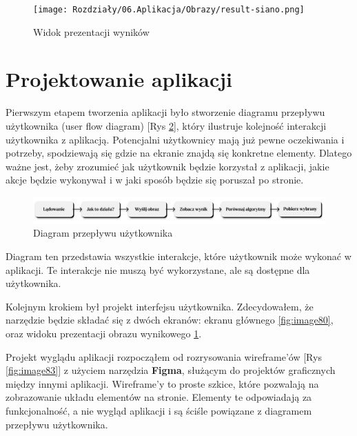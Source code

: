\begin{figure}[ht]
    \centering
    \begin{minipage}[t]{0.85\linewidth}
        \texttt{[image: Rozdziały/06.Aplikacja/Obrazy/result-siano.png]}  
        \caption{Widok prezentacji wyników}
        \label{fig:image81}
    \end{minipage}
\end{figure}

\newpage
\section{Projektowanie aplikacji}

Pierwszym etapem tworzenia aplikacji było stworzenie diagramu przepływu użytkownika (user flow diagram) [Rys \ref{fig:image82}], który ilustruje kolejność interakcji użytkownika z aplikacją. Potencjalni użytkownicy mają już pewne oczekiwania i potrzeby, spodziewają się gdzie na ekranie znajdą się konkretne elementy. Dlatego ważne jest, żeby zrozumieć jak użytkownik będzie korzystał z aplikacji, jakie akcje będzie wykonywał i w jaki sposób będzie się poruszał po stronie.

\begin{figure}[ht]
    \centering
    \begin{minipage}[t]{0.99\linewidth}
        \includegraphics[width=\linewidth]{Rozdziały/06.Aplikacja/Obrazy/user-flow.png}  
        \caption{Diagram przepływu użytkownika}
        \label{fig:image82}
    \end{minipage}
\end{figure}

Diagram ten przedstawia wszystkie interakcje, które użytkownik może wykonać w aplikacji. Te interakcje nie muszą być wykorzystane, ale są dostępne dla użytkownika.

Kolejnym krokiem był projekt interfejsu użytkownika. Zdecydowałem, że narzędzie będzie składać się z dwóch ekranów: ekranu głównego \ref{fig:image80}, oraz widoku prezentacji obrazu wynikowego \ref{fig:image81}.

Projekt wyglądu aplikacji rozpocząłem od rozrysowania wireframe'ów [Rys \ref{fig:image83}] z użyciem narzędzia \textbf{Figma}, służącym do projektów graficznych między innymi aplikacji. Wireframe'y to proste szkice, które pozwalają na zobrazowanie układu elementów na stronie. Elementy te odpowiadają za funkcjonalność, a nie wygląd aplikacji i są ściśle powiązane z diagramem przepływu użytkownika.

